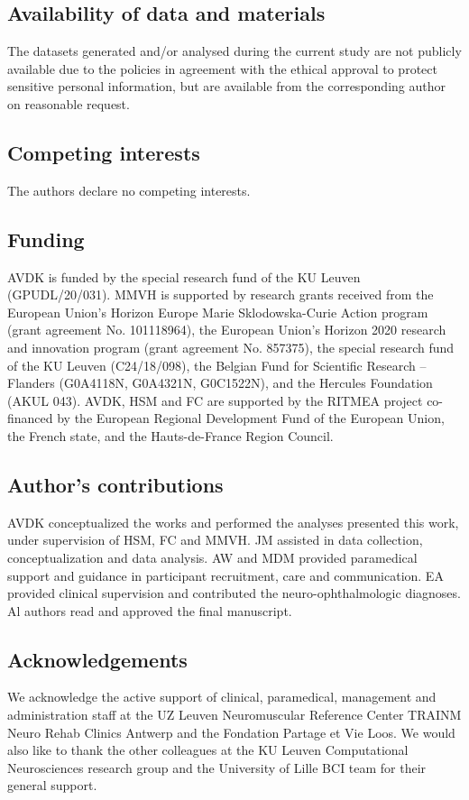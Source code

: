\documentclass{article}
\begin{document}
\subsection*{Availability of data and materials}

The datasets generated and/or analysed during the current study are not publicly
available due to the policies in agreement with the ethical approval to protect
sensitive personal information, but are available from the corresponding author
on reasonable request.

\subsection*{Competing interests}
The authors declare no competing interests.

\subsection*{Funding}
AVDK is funded by the special research fund of the KU Leuven (GPUDL/20/031).
MMVH is supported by research grants received from the European Union’s
Horizon Europe Marie Sklodowska-Curie Action program
(grant agreement No. 101118964), the European Union’s Horizon 2020 research and
innovation program (grant agreement No. 857375), the special research fund of
the KU Leuven (C24/18/098), the Belgian Fund for Scientific Research – Flanders
(G0A4118N, G0A4321N, G0C1522N), and the Hercules Foundation (AKUL 043).
AVDK, HSM and FC are supported by the RITMEA project co-financed by the
European Regional Development Fund of the European Union, the French state,
and the Hauts-de-France Region Council.

\subsection*{Author's contributions}
AVDK conceptualized the works and performed the analyses
presented this work, under supervision of HSM, FC and MMVH.
JM assisted in data collection, conceptualization and data analysis.
AW and MDM provided paramedical support and guidance in participant recruitment,
care and communication.
EA provided clinical supervision and contributed the neuro-ophthalmologic diagnoses.
Al authors read and approved the final manuscript.


\subsection*{Acknowledgements}
We acknowledge the active support of clinical, paramedical, management and
administration staff at the UZ Leuven Neuromuscular Reference Center
TRAINM Neuro Rehab Clinics Antwerp and the Fondation Partage et Vie Loos.
We would also like to thank the other colleagues at the KU Leuven Computational
Neurosciences research group and the University of Lille BCI team
for their general support.
\end{document}
